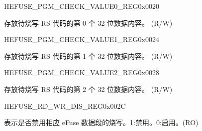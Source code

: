\begin{register}{H}{EFUSE\_PGM\_CHECK\_VALUE0\_REG}{0x0020}\label{regdesc:EFUSEPGMCHECKVALUE0REG}
%
\regnewline%
\begin{regdesc}\begin{reglist}
\label{fielddesc:EFUSEPGMRSDATA0}\item [EFUSE\_PGM\_RS\_DATA\_0] 存放待烧写 RS 代码的第 0 个 32 位数据内容。 (R/W)
\end{reglist}\end{regdesc}
\end{register}


\begin{register}{H}{EFUSE\_PGM\_CHECK\_VALUE1\_REG}{0x0024}\label{regdesc:EFUSEPGMCHECKVALUE1REG}
%
\regnewline%
\begin{regdesc}\begin{reglist}
\label{fielddesc:EFUSEPGMRSDATA1}\item [EFUSE\_PGM\_RS\_DATA\_1] 存放待烧写 RS 代码的第 1 个 32 位数据内容。 (R/W)
\end{reglist}\end{regdesc}
\end{register}


\begin{register}{H}{EFUSE\_PGM\_CHECK\_VALUE2\_REG}{0x0028}\label{regdesc:EFUSEPGMCHECKVALUE2REG}
%
\regnewline%
\begin{regdesc}\begin{reglist}
\label{fielddesc:EFUSEPGMRSDATA2}\item [EFUSE\_PGM\_RS\_DATA\_2] 存放待烧写 RS 代码的第 2 个 32 位数据内容。 (R/W)
\end{reglist}\end{regdesc}
\end{register}




\begin{register}{H}{EFUSE\_RD\_WR\_DIS\_REG}{0x002C}\label{regdesc:EFUSERDWRDISREG}
%
\regnewline%
\begin{regdesc}\begin{reglist}
\label{fielddesc:EFUSEWRDIS}\item [EFUSE\_WR\_DIS] 表示是否禁用相应 eFuse 数据段的烧写。1:禁用。0:启用。(RO)
\end{reglist}\end{regdesc}
\end{register}


